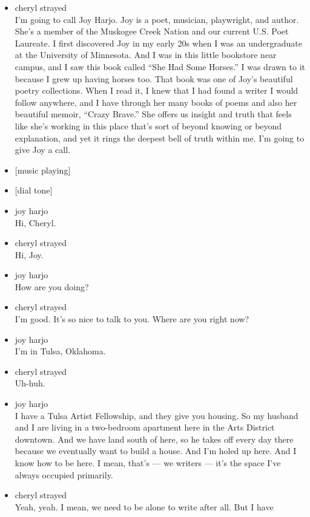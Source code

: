 \begin{itemize}
\item
  cheryl strayed\\
  I'm going to call Joy Harjo. Joy is a poet, musician, playwright, and
  author. She's a member of the Muskogee Creek Nation and our current
  U.S. Poet Laureate. I first discovered Joy in my early 20s when I was
  an undergraduate at the University of Minnesota. And I was in this
  little bookstore near campus, and I saw this book called ``She Had
  Some Horses.'' I was drawn to it because I grew up having horses too.
  That book was one of Joy's beautiful poetry collections. When I read
  it, I knew that I had found a writer I would follow anywhere, and I
  have through her many books of poems and also her beautiful memoir,
  ``Crazy Brave.'' She offers us insight and truth that feels like she's
  working in this place that's sort of beyond knowing or beyond
  explanation, and yet it rings the deepest bell of truth within me. I'm
  going to give Joy a call.
\item
  {[}music playing{]}
\item
  {[}dial tone{]}
\item
  joy harjo\\
  Hi, Cheryl.
\item
  cheryl strayed\\
  Hi, Joy.
\item
  joy harjo\\
  How are you doing?
\item
  cheryl strayed\\
  I'm good. It's so nice to talk to you. Where are you right now?
\item
  joy harjo\\
  I'm in Tulsa, Oklahoma.
\item
  cheryl strayed\\
  Uh-huh.
\item
  joy harjo\\
  I have a Tulsa Artist Fellowship, and they give you housing. So my
  husband and I are living in a two-bedroom apartment here in the Arts
  District downtown. And we have land south of here, so he takes off
  every day there because we eventually want to build a house. And I'm
  holed up here. And I know how to be here. I mean, that's --- we
  writers --- it's the space I've always occupied primarily.
\item
  cheryl strayed\\
  Yeah, yeah. I mean, we need to be alone to write after all. But I have

\end{itemize}
